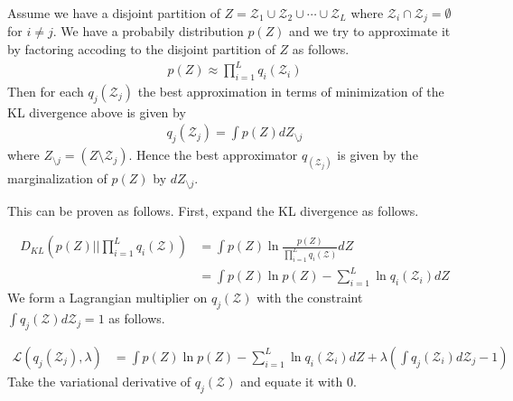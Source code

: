 \documentclass[a4]{article}
\begin{document}
Assume we have a disjoint partition of $Z = \mathcal{Z}_1 \cup \mathcal{Z}_2 \cup \cdots \cup \mathcal{Z}_L$
where $\mathcal{Z}_i \cap \mathcal{Z}_j = \emptyset$ for $i \ne j$.
We have a probabily distribution $p(Z)$ and we try to approximate it by factoring accoding to the disjoint
partition of $Z$ as follows.
\begin{equation}
\begin{aligned}
p(Z) \approx \prod_{i=1}^L q_i(\mathcal{Z}_i)
\end{aligned}
\end{equation}
Then for each $q_j(\mathcal{Z}_j)$ the best approximation in terms of minimization of the KL divergence above
is given by
\begin{equation}
\begin{aligned}
q_j(\mathcal{Z}_j) = \int p(Z)dZ_{\setminus j}\label{eq:optimal_Z_j}
\end{aligned}
\end{equation}
where $Z_{\setminus j} = (Z \setminus \mathcal{Z}_j)$.
Hence the best approximator $q_(\mathcal{Z}_j)$ is given by the marginalization of $p(Z)$ by $dZ_{\setminus j}$.

This can be proven as follows. First, expand the KL divergence as follows.

\begin{equation}
\begin{aligned}
D_{KL}\left(p(Z)\Big|\Big|\prod_{i=1}^Lq_i(\mathcal{Z})\right)
&=
\int p(Z) \ln\frac{p(Z)} { \prod_{i=1}^Lq_i(\mathcal{Z})} dZ\\
&=
\int p(Z) \ln p(Z) - \sum_{i=1}^L \ln q_i(\mathcal{Z}_i) dZ
\end{aligned}
\end{equation}
We form a Lagrangian multiplier on $q_j(\mathcal{Z})$ with the constraint
$\int q_j(\mathcal{Z})d\mathcal{Z}_j=1$ as follows.


\begin{equation}
\begin{aligned}
\mathcal{L}(q_j(\mathcal{Z}_j), \lambda) &=
\int p(Z) \ln p(Z) - \sum_{i=1}^L \ln q_i(\mathcal{Z}_i) dZ +
\lambda (\int q_j(\mathcal{Z}_i)d\mathcal{Z}_j - 1)
\end{aligned}
\end{equation}
Take the variational derivative of $q_j(\mathcal{Z})$ and equate it with 0.
\end{document}
